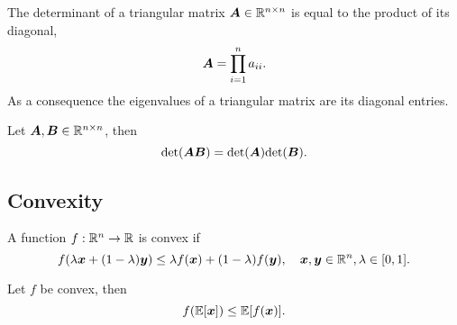 \begin{lemma}
    The determinant of a triangular matrix $\bm{A} \in \mathbb{R}^{n \times n}$ is equal to the product of
    its diagonal, \[
        \bm{A} = \prod_{i=1}^n a_{ii}.
    \]
    As a consequence the eigenvalues of a triangular matrix are its diagonal entries.
\end{lemma}

\begin{lemma}
    Let $\bm{A}, \bm{B} \in \mathbb{R}^{n \times n}$, then \[
        \det{\mat{A} \mat{B}} = \det{\mat{A}} \det{\mat{B}}.
    \]
\end{lemma}

\subsection{Convexity}

\begin{definition}[Convexity]
    A function $f: \mathbb{R}^n \to \mathbb{R}$ is convex if \[
        f(\lambda \bm{x} + (1-\lambda) \bm{y}) \leq \lambda f(\bm{x}) + (1-\lambda) f(\bm{y}), \quad \bm{x}, \bm{y} \in \mathbb{R}^n, \lambda \in [0,1].
    \]
\end{definition}

\begin{lemma}
    Let $f$ be convex, then \[
        f(\mathbb{E}[\bm{x}]) \leq \mathbb{E}[f(\bm{x})].
    \]
\end{lemma}
